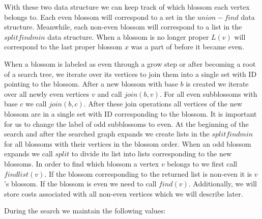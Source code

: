 With these two data structure we can keep track of which blossom each vertex belongs to. Each even blossom will correspond to a set in the $union-find$ data structure. Meanwhile, each non-even blossom will correspond to a list in the $splitfindmin$ data structure. When a blossom is no longer proper $L(v)$ will correspond to the last proper blossom $x$ was a part of before it became even.

When a blossom is labeled as even through a grow step or after becoming a root of a search tree, we iterate over its vertices to join them into a single set with ID pointing to the blossom. After a new blossom with base $b$ is created we iterate over all newly even vertices $v$ and call $join(b, v)$. For all even subblossoms with base $c$ we call $join(b, c)$. After these join operations all vertices of the new blossom are in a single set with ID corresponding to the blossom. It is important for us to change the label of odd subblossoms to even. At the beginning of the search and after the searched graph expands we create lists in the $splitfindmin$ for all blossoms with their vertices in the blossom order. When an odd blossom expands we call $split$ to divide its list into lists corresponding to the new blossoms. In order to find which blossom a vertex $v$ belongs to we first call $findlist(v)$. If the blossom corresponding to the returned list is non-even it is $v$'s blossom. If the blossom is even we need to call $find(v)$. Additionally, we will store costs associated with all non-even vertices which we will describe later.

During the search we maintain the following values:

